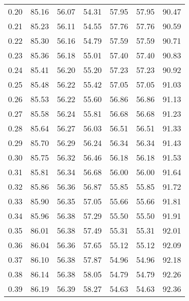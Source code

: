 \begin{tabular}{|c|c|c|c|c|c|c|}
      0.20 &     85.16 &     56.07 &      54.31 &   57.95 &      57.95 &         90.47 \\
      0.21 &     85.23 &     56.11 &      54.55 &   57.76 &      57.76 &         90.59 \\
      0.22 &     85.30 &     56.16 &      54.79 &   57.59 &      57.59 &         90.71 \\
      0.23 &     85.36 &     56.18 &      55.01 &   57.40 &      57.40 &         90.83 \\
      0.24 &     85.41 &     56.20 &      55.20 &   57.23 &      57.23 &         90.92 \\
      0.25 &     85.48 &     56.22 &      55.42 &   57.05 &      57.05 &         91.03 \\
      0.26 &     85.53 &     56.22 &      55.60 &   56.86 &      56.86 &         91.13 \\
      0.27 &     85.58 &     56.24 &      55.81 &   56.68 &      56.68 &         91.23 \\
      0.28 &     85.64 &     56.27 &      56.03 &   56.51 &      56.51 &         91.33 \\
      0.29 &     85.70 &     56.29 &      56.24 &   56.34 &      56.34 &         91.43 \\
      0.30 &     85.75 &     56.32 &      56.46 &   56.18 &      56.18 &         91.53 \\
      0.31 &     85.81 &     56.34 &      56.68 &   56.00 &      56.00 &         91.64 \\
      0.32 &     85.86 &     56.36 &      56.87 &   55.85 &      55.85 &         91.72 \\
      0.33 &     85.90 &     56.35 &      57.05 &   55.66 &      55.66 &         91.81 \\
      0.34 &     85.96 &     56.38 &      57.29 &   55.50 &      55.50 &         91.91 \\
      0.35 &     86.01 &     56.38 &      57.49 &   55.31 &      55.31 &         92.01 \\
      0.36 &     86.04 &     56.36 &      57.65 &   55.12 &      55.12 &         92.09 \\
      0.37 &     86.10 &     56.38 &      57.87 &   54.96 &      54.96 &         92.18 \\
      0.38 &     86.14 &     56.38 &      58.05 &   54.79 &      54.79 &         92.26 \\
      0.39 &     86.19 &     56.39 &      58.27 &   54.63 &      54.63 &         92.36 \\

\end{tabular}
